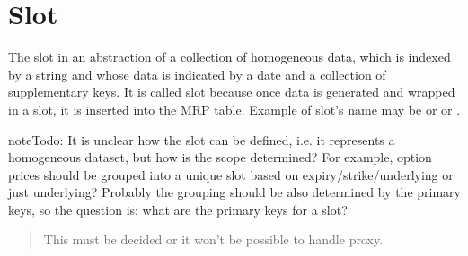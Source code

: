 \documentclass[letterpaper,10pt,english]{sphinxmanual}
\begin{document}
\section{Slot}
\label{\detokenize{slot_prod:slot}}
The slot in an abstraction of a collection of homogeneous data, which is
indexed by a string  and whose data is indicated by a date and a
collection of supplementary keys.
It is called slot because once data is generated and wrapped in a slot, it is
inserted into the MRP table. Example of slot’s name may be
 or  or
.

\begin{sphinxadmonition}{note}{\label{slot_prod:index-0}Todo:}
It is unclear how the slot can be defined, i.e. it represents a
homogeneous dataset,
but how is the scope determined? For example, option prices
should be grouped into a unique slot based on
expiry/strike/underlying or just underlying? Probably the grouping
should be also determined by the primary keys, so the question is:
what are the primary keys for a slot?
\begin{quote}

This must be decided or it won’t be possible to handle proxy.
\end{quote}
\end{sphinxadmonition}
\end{document}
